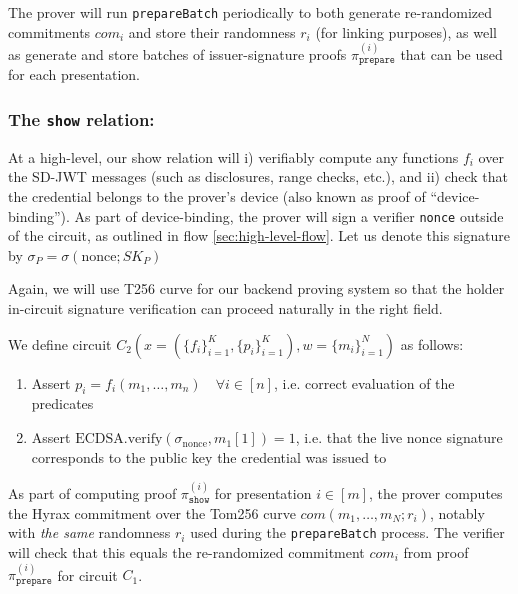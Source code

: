 The prover will run \texttt{prepareBatch} periodically to both generate re-randomized commitments $com_i$ and store their randomness $r_i$ (for linking purposes), 
as well as generate and store batches of issuer-signature proofs $\pi_{\texttt{prepare}}^{(i)}$ that can be used for each presentation.

\subsubsection{The \texttt{show} relation:}

At a high-level, our show relation will i) verifiably compute any functions $f_i$ over the SD-JWT messages (such as disclosures, range checks, etc.),
and ii) check that the credential belongs to the prover's device (also known as proof of ``device-binding''). 
As part of device-binding, the prover will sign a verifier \texttt{nonce} outside of the circuit, as outlined in flow \ref{sec:high-level-flow}. 
Let us denote this signature by $\sigma_P = \sigma(\text{nonce}; SK_P)$

Again, we will use T256 curve for our backend proving system so that the holder in-circuit signature verification can proceed naturally in the right field.

\begin{mdframed}[style=zkprotocolwithheader, frametitle=Circuit $C_2$ for the \texttt{show} relation]

We define circuit $C_2(x = (\{f_i\}_{i=1}^K, \{p_i\}_{i=1}^K), w = \{m_i\}_{i=1}^N)$ as follows:

\begin{enumerate}
\item Assert $p_i = f_i(m_1, \dots, m_n) \quad \forall i \in [n]$, i.e. correct evaluation of the predicates
\item Assert $\text{ECDSA.verify}(\sigma_{\text{nonce}}, m_1[1]) = 1$, i.e. that the live nonce signature corresponds to the public key the credential was issued to
\end{enumerate}

\end{mdframed}

As part of computing proof $\pi_{\texttt{show}}^{(i)}$ for presentation $i \in [m]$, the prover computes the Hyrax commitment over the Tom256 curve $com(m_1, \dots, m_N; r_i)$, 
notably with \textit{the same} randomness $r_i$ used during the \texttt{prepareBatch} process.
The verifier will check that this equals the re-randomized commitment $com_i$ from proof $\pi_{\texttt{prepare}}^{(i)}$ for circuit $C_1$. 

